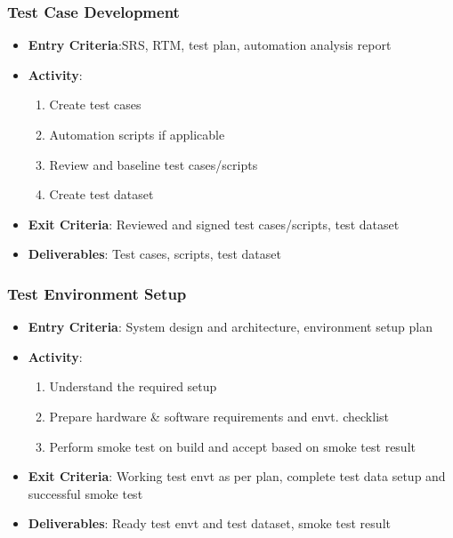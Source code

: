 \documentclass{article}
\begin{document}
\subsubsection{Test Case Development}
\begin{itemize}
    \item \textbf{Entry Criteria}:SRS, RTM, test plan, automation analysis report
    
    \item \textbf{Activity}: 
    \begin{enumerate}
        \item Create test cases
        
        \item Automation scripts if applicable
        
        \item Review and baseline test cases/scripts
        
        \item Create test dataset
    \end{enumerate}
    
    \item \textbf{Exit Criteria}: Reviewed and signed test cases/scripts, test dataset
    
    \item \textbf{Deliverables}: Test cases, scripts, test dataset
\end{itemize}

\subsubsection{Test Environment Setup}
\begin{itemize}
    \item \textbf{Entry Criteria}: System design and architecture, environment setup plan
    
    \item \textbf{Activity}:
    \begin{enumerate}
        \item Understand the required setup
        
        \item Prepare hardware \& software requirements and envt. checklist
        
        \item Perform smoke test on build and accept based on smoke test result
    \end{enumerate}
    
    \item \textbf{Exit Criteria}: Working test envt as per plan, complete test data setup and successful smoke test
    
    \item \textbf{Deliverables}: Ready test envt and test dataset, smoke test result
\end{itemize}
\end{document}
